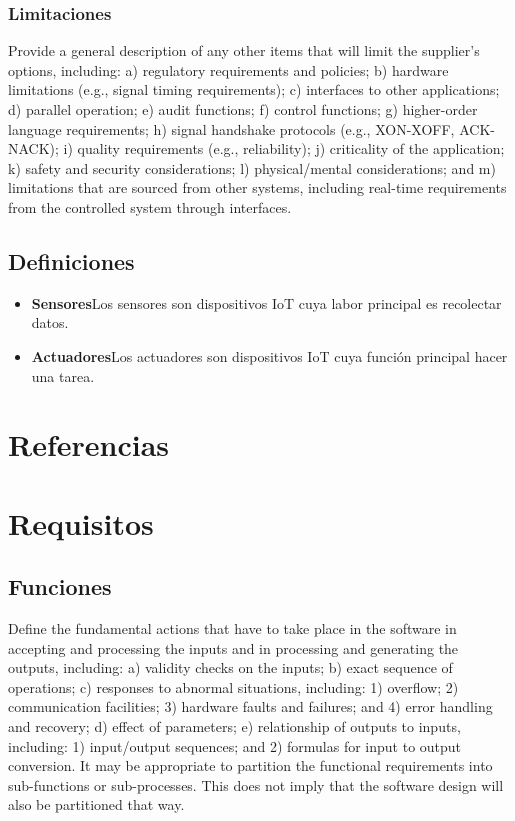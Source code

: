 \documentclass[12pt, a4paper, twoside]{article}
\newcommand\ttab{\tab \hspace{-5cm}}
\begin{document}
 \subsubsection{Limitaciones}
 Provide a general description of any other items that will limit the supplier's options, including:
 a) regulatory requirements and policies;
 b) hardware limitations (e.g., signal timing requirements);
 c) interfaces to other applications;
 d) parallel operation;
 e) audit functions;
 f) control functions;
 g) higher-order language requirements;
 h) signal handshake protocols (e.g., XON-XOFF, ACK-NACK);
 i) quality requirements (e.g., reliability);
 j) criticality of the application;
 k) safety and security considerations;
 l) physical/mental considerations; and
 m) limitations that are sourced from other systems, including real-time requirements from the
 controlled system through interfaces.

\subsection{Definiciones}
\begin{itemize}
    \item \textbf{Sensores}\ttab Los sensores son dispositivos IoT cuya labor principal es recolectar datos.
    \item \textbf{Actuadores}\ttab Los actuadores son dispositivos IoT cuya función principal hacer una tarea.
\end{itemize}

\section{Referencias}

\section{Requisitos}
\subsection{Funciones}
Define the fundamental actions that have to take place in the software in accepting and processing the
inputs and in processing and generating the outputs, including:
a) validity checks on the inputs;
b) exact sequence of operations;
c) responses to abnormal situations, including:
1) overflow;
2) communication facilities;
3) hardware faults and failures; and
4) error handling and recovery;
d) effect of parameters;
e) relationship of outputs to inputs, including:
1) input/output sequences; and
2) formulas for input to output conversion.
It may be appropriate to partition the functional requirements into sub-functions or sub-processes.
This does not imply that the software design will also be partitioned that way.
\end{document}

